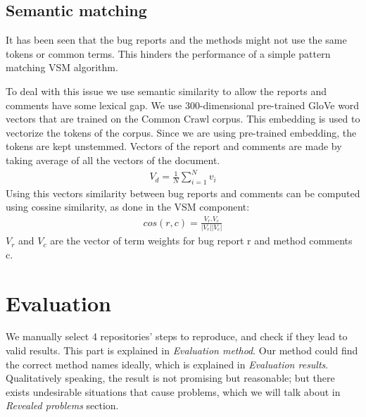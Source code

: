 \documentclass[sigconf]{acmart}
\begin{document}
\subsection{Semantic matching}
It has been seen that the bug reports and the methods might not use the same tokens or common terms. This hinders the performance of a simple pattern matching VSM algorithm.

To deal with this issue we use semantic similarity to allow the reports and comments have some lexical gap. We use 300-dimensional pre-trained GloVe word vectors that are trained on the Common Crawl corpus\cite{pennington-etal-2014-glove}. This embedding is used to vectorize the tokens of the corpus. Since we are using pre-trained embedding, the tokens are kept unstemmed. Vectors of the report and comments are made by taking average of all the vectors of the document.
\begin{gather*}
	V_d = \frac{1}{N}\sum_{i=1}^{N}v_i
\end{gather*}
Using this vectors similarity between bug reports and comments can be computed using cossine similarity, as done in the VSM component:
\begin{gather*}
cos(r,c)=\frac{V_r.V_c}{|V_r||V_c|}
\end{gather*}
$V_r$ and $V_c$ are the vector of term weights for bug report r and method comments c.

\section{Evaluation}
 We manually select 4 repositories' steps to reproduce, and check if they lead to valid results. This part is explained in \emph{Evaluation method}. Our method could find the correct method names ideally, which is explained in \emph{Evaluation results}. Qualitatively speaking, the result is not promising but reasonable; but there exists undesirable situations that cause problems, which we will talk about in \emph{Revealed problems} section.
\end{document}
